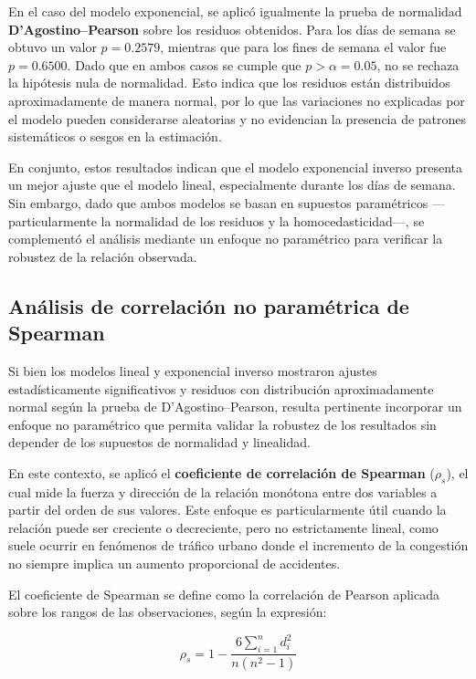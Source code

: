 \documentclass[12pt]{article}
\begin{document}
En el caso del modelo exponencial, se aplicó igualmente la prueba de normalidad \textbf{D'Agostino–Pearson} sobre los residuos obtenidos. Para los días de semana se obtuvo un valor $p = 0.2579$, mientras que para los fines de semana el valor fue $p = 0.6500$. Dado que en ambos casos se cumple que $p > \alpha = 0.05$, no se rechaza la hipótesis nula de normalidad. Esto indica que los residuos están distribuidos aproximadamente de manera normal, por lo que las variaciones no explicadas por el modelo pueden considerarse aleatorias y no evidencian la presencia de patrones sistemáticos o sesgos en la estimación.

En conjunto, estos resultados indican que el modelo exponencial inverso presenta un mejor ajuste que el modelo lineal, especialmente durante los días de semana.
Sin embargo, dado que ambos modelos se basan en supuestos paramétricos —particularmente la normalidad de los residuos y la homocedasticidad—, se complementó el análisis mediante un enfoque no paramétrico para verificar la robustez de la relación observada.

\subsection{Análisis de correlación no paramétrica de Spearman}

Si bien los modelos lineal y exponencial inverso mostraron ajustes estadísticamente significativos y residuos con distribución aproximadamente normal según la prueba de D’Agostino–Pearson,
resulta pertinente incorporar un enfoque no paramétrico que permita validar la robustez de los resultados sin depender de los supuestos de normalidad y linealidad.

En este contexto, se aplicó el \textbf{coeficiente de correlación de Spearman} ($\rho_s$), el cual mide la fuerza y dirección de la relación monótona entre dos variables a partir del orden de sus valores. Este enfoque es particularmente útil cuando la relación puede ser creciente o decreciente, pero no estrictamente lineal, como suele ocurrir en fenómenos de tráfico urbano donde el incremento de la congestión no siempre implica un aumento proporcional de accidentes.

El coeficiente de Spearman se define como la correlación de Pearson aplicada sobre los rangos de las observaciones, según la expresión:

\begin{equation}
\rho_s = 1 - \frac{6 \sum_{i=1}^{n} d_i^2}{n(n^2 - 1)}
\end{equation}
\end{document}
